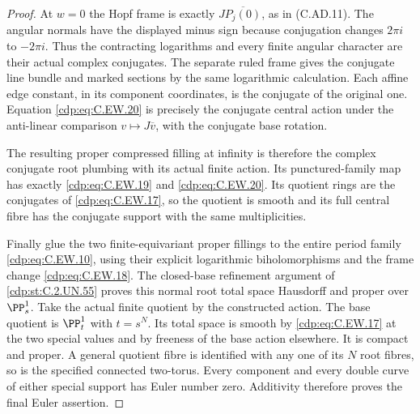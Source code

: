 \begin{proof}
At $w=0$ the Hopf frame is exactly
$J\overline{P_j(0)}$, as in (C.AD.11).
The angular normals have the displayed minus sign
because conjugation changes $2\pi i$ to $-2\pi i$.
Thus the contracting logarithms and every finite
angular character are their actual complex
conjugates. The separate ruled frame gives the
conjugate line bundle and marked sections by the
same logarithmic calculation. Each affine edge
constant, in its component coordinates, is the
conjugate of the original one. Equation \eqref{cdp:eq:C.EW.20}
is precisely the conjugate central action under
the anti-linear comparison $v\mapsto J\overline v$,
with the conjugate base rotation.

The resulting proper compressed filling at infinity
is therefore the complex conjugate root plumbing
with its actual finite action. Its punctured-family
map has exactly \eqref{cdp:eq:C.EW.19} and \eqref{cdp:eq:C.EW.20}.
Its quotient rings are the conjugates of
\eqref{cdp:eq:C.EW.17}, so the quotient is smooth and its full
central fibre has the conjugate support with the
same multiplicities.

Finally glue the two finite-equivariant proper
fillings to the entire period family \eqref{cdp:eq:C.EW.10},
using their explicit logarithmic biholomorphisms
and the frame change \eqref{cdp:eq:C.EW.18}. The closed-base
refinement argument of \ref{cdp:st:C.2.UN.55} proves this normal
root total space Hausdorff and proper over
$\PP^1_s$. Take the actual finite quotient by
the constructed action. The base quotient is
$\PP^1_t$ with $t=s^N$. Its total space is smooth
by \eqref{cdp:eq:C.EW.17} at the two special values and by
freeness of the base action elsewhere. It is
compact and proper. A general quotient fibre is
identified with any one of its $N$ root fibres,
so is the specified connected two-torus.
Every component and every double curve of either
special support has Euler number zero. Additivity
therefore proves the final Euler assertion.


\end{proof}

